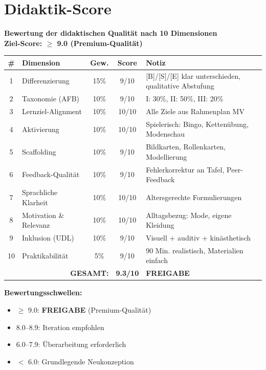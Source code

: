 \documentclass[11pt,a4paper]{article}
\begin{document}
\newpage
\section{Didaktik-Score}

\begin{scorebox}
\textbf{Bewertung der didaktischen Qualität nach 10 Dimensionen}\\
\textbf{Ziel-Score: $\geq$ 9.0 (Premium-Qualität)}

\vspace{1em}
\begin{tabular}{|c|l|c|c|p{4.5cm}|}
\hline
\textbf{\#} & \textbf{Dimension} & \textbf{Gew.} & \textbf{Score} & \textbf{Notiz} \\
\hline
1 & Differenzierung & 15\% & 9/10 & [B]/[S]/[E] klar unterschieden, qualitative Abstufung \\
\hline
2 & Taxonomie (AFB) & 10\% & 9/10 & I: 30\%, II: 50\%, III: 20\% \\
\hline
3 & Lernziel-Alignment & 10\% & 10/10 & Alle Ziele aus Rahmenplan MV \\
\hline
4 & Aktivierung & 10\% & 10/10 & Spielerisch: Bingo, Kettenübung, Modenschau \\
\hline
5 & Scaffolding & 10\% & 9/10 & Bildkarten, Rollenkarten, Modellierung \\
\hline
6 & Feedback-Qualität & 10\% & 9/10 & Fehlerkorrektur an Tafel, Peer-Feedback \\
\hline
7 & Sprachliche Klarheit & 10\% & 10/10 & Altersgerechte Formulierungen \\
\hline
8 & Motivation \& Relevanz & 10\% & 10/10 & Alltagsbezug: Mode, eigene Kleidung \\
\hline
9 & Inklusion (UDL) & 10\% & 9/10 & Visuell + auditiv + kinästhetisch \\
\hline
10 & Praktikabilität & 5\% & 9/10 & 90 Min. realistisch, Materialien einfach \\
\hline
\multicolumn{3}{|r|}{\textbf{GESAMT:}} & \textbf{9.3/10} & \textcolor{successgreen}{\textbf{FREIGABE}} \\
\hline
\end{tabular}

\vspace{1em}
\textbf{Bewertungsschwellen:}
\begin{itemize}
    \item[$\boxtimes$] \textcolor{successgreen}{$\geq$ 9.0: \textbf{FREIGABE} (Premium-Qualität)}
    \item[$\Box$] \textcolor{warningorange}{8.0--8.9: Iteration empfohlen}
    \item[$\Box$] 6.0--7.9: Überarbeitung erforderlich
    \item[$\Box$] $<$ 6.0: Grundlegende Neukonzeption
\end{itemize}
\end{scorebox}
\end{document}
